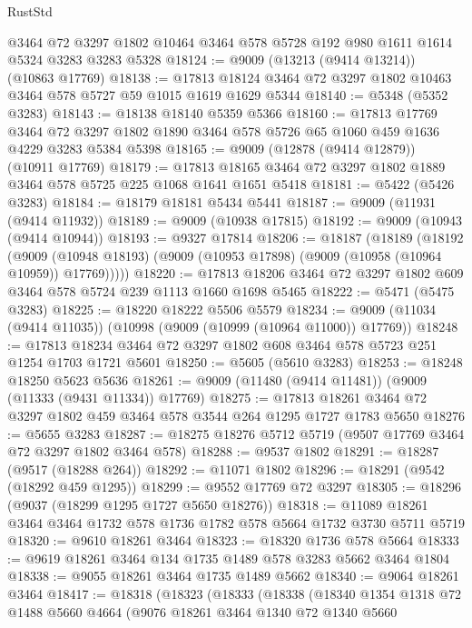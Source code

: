 \begin{lexlean}{RustStd}
\begin{coremodule}
    @3464
    @72
    @3297
    @1802
    @10464
    @3464
    @578
    @5728
    @192
    @980
    @1611
    @1614
    @5324
    @3283
    @3283
    @5328
@18124 := @9009 (@13213 (@9414 @13214)) (@10863 @17769)
@18138 := @17813 @18124 @3464 @72 @3297 @1802 @10463 @3464 @578 @5727 @59 @1015 @1619 @1629 @5344
@18140 := @5348 (@5352 @3283)
@18143 := @18138 @18140 @5359 @5366
@18160 := @17813
    @17769
    @3464
    @72
    @3297
    @1802
    @1890
    @3464
    @578
    @5726
    @65
    @1060
    @459
    @1636
    @4229
    @3283
    @5384
    @5398
@18165 := @9009 (@12878 (@9414 @12879)) (@10911 @17769)
@18179 := @17813 @18165 @3464 @72 @3297 @1802 @1889 @3464 @578 @5725 @225 @1068 @1641 @1651 @5418
@18181 := @5422 (@5426 @3283)
@18184 := @18179 @18181 @5434 @5441
@18187 := @9009 (@11931 (@9414 @11932))
@18189 := @9009 (@10938 @17815)
@18192 := @9009 (@10943 (@9414 @10944))
@18193 := @9327 @17814
@18206 := @18187
    (@18189
      (@18192
        (@9009 (@10948 @18193) (@9009 (@10953 @17898) (@9009 (@10958 (@10964 @10959)) @17769)))))
@18220 := @17813 @18206 @3464 @72 @3297 @1802 @609 @3464 @578 @5724 @239 @1113 @1660 @1698 @5465
@18222 := @5471 (@5475 @3283)
@18225 := @18220 @18222 @5506 @5579
@18234 := @9009 (@11034 (@9414 @11035)) (@10998 (@9009 (@10999 (@10964 @11000)) @17769))
@18248 := @17813 @18234 @3464 @72 @3297 @1802 @608 @3464 @578 @5723 @251 @1254 @1703 @1721 @5601
@18250 := @5605 (@5610 @3283)
@18253 := @18248 @18250 @5623 @5636
@18261 := @9009 (@11480 (@9414 @11481)) (@9009 (@11333 (@9431 @11334)) @17769)
@18275 := @17813 @18261 @3464 @72 @3297 @1802 @459 @3464 @578 @3544 @264 @1295 @1727 @1783 @5650
@18276 := @5655 @3283
@18287 := @18275 @18276 @5712 @5719 (@9507 @17769 @3464 @72 @3297 @1802 @3464 @578)
@18288 := @9537 @1802
@18291 := @18287 (@9517 (@18288 @264))
@18292 := @11071 @1802
@18296 := @18291 (@9542 (@18292 @459 @1295))
@18299 := @9552 @17769 @72 @3297
@18305 := @18296 (@9037 (@18299 @1295 @1727 @5650 @18276))
@18318 := @11089 @18261 @3464 @3464 @1732 @578 @1736 @1782 @578 @5664 @1732 @3730 @5711 @5719
@18320 := @9610 @18261 @3464
@18323 := @18320 @1736 @578 @5664
@18333 := @9619 @18261 @3464 @134 @1735 @1489 @578 @3283 @5662 @3464 @1804
@18338 := @9055 @18261 @3464 @1735 @1489 @5662
@18340 := @9064 @18261 @3464
@18417 := @18318
    (@18323
      (@18333
        (@18338
          (@18340
            @1354
            @1318
            @72
            @1488
            @5660
            @4664
            (@9076
              @18261
              @3464
              @1340
              @72
              @1340
              @5660

\end{coremodule}
\end{lexlean}
